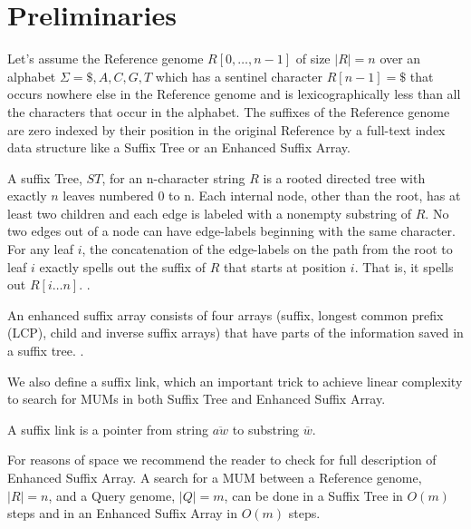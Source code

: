 \documentclass[runningheads,a5paper]{llncs}
\begin{document}
\section{Preliminaries}
Let's assume the Reference genome $R[0,\ldots, n-1]$ of size $|R|=n$ over an alphabet $\Sigma={ \$, A, C, G, T}$ which has a sentinel character $R[n-1] = \$$ that occurs nowhere else in the Reference genome and is lexicographically less than all the characters that occur in the alphabet. The suffixes of the Reference genome are zero indexed by their position in the original Reference by a full-text index data structure like a Suffix Tree or an Enhanced Suffix Array. 
\begin{definition}
A suffix Tree, $ST$, for an n-character string $R$ is a rooted directed tree with exactly $n$ leaves numbered 0 to n. Each internal node, other than the root, has at least two children and each edge is labeled with a nonempty substring of $R$. No two edges out of a node can have edge-labels beginning with the same character. For any leaf $i$, the concatenation of the edge-labels on the path from the root to leaf $i$ exactly spells out the suffix of $R$ that starts at position $i$. That is, it spells out $R[i\ldots n]$. \cite{Gusfield1997}.
\end{definition}
\begin{definition}
  An enhanced suffix array consists of four arrays (suffix, longest common prefix (LCP), child and inverse suffix arrays) that have parts of the information saved in a suffix tree. \cite{Abouelhoda2004}.
\end{definition}
We also define a suffix link, which an important trick to achieve linear complexity to search for MUMs in both Suffix Tree and Enhanced Suffix Array.
\begin{definition}
A suffix link is a pointer from string $\overline{aw}$ to substring $\overline{w}$.
\end{definition}
For reasons of space we recommend the reader to check \cite{Abouelhoda2004} for full description of Enhanced Suffix Array.
A search for a MUM between a Reference genome, $|R|=n$, and a Query genome, $|Q|=m$,  can be done in a Suffix Tree in $O(m)$ steps and in an Enhanced Suffix Array in $O(m)$ steps.
\end{document}

